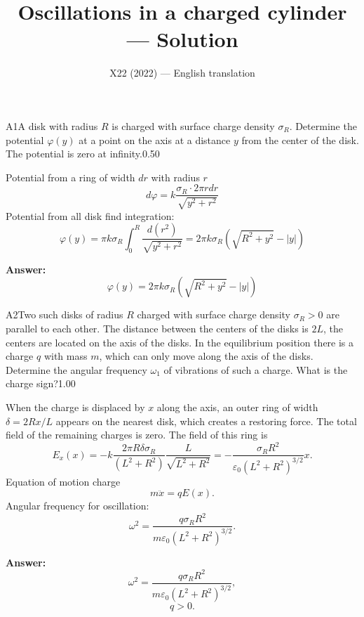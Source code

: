 \documentclass[11pt,a4paper]{article}
\title{\textbf{Oscillations in a charged cylinder --- Solution}}
\author{\normalsize X22 (2022) — English translation}
\date{}
\begin{document}
\maketitle\vspace{-0.5em}
\begin{solcard}{A1}{A disk with radius $R$ is charged with surface charge density $\sigma_R$. Determine the potential $\varphi(y)$ at a point on the axis at a distance $y$ from the center of the disk. The potential is zero at infinity.}{0.50}

Potential from a ring of width $dr$ with radius $r$ $$d \varphi = k \frac{\sigma_R \cdot 2 \pi r dr}{\sqrt{y^2 + r^2} }$$ Potential from all disk find integration: $$\varphi(y)= \pi k \sigma_R \int^R_0 \frac{d(r^2)}{\sqrt{y^2 + r^2} } =2\pi k \sigma_R \left( \sqrt{R^2+y^2}- |y| \right)$$

\par\smallskip\noindent\textbf{Answer:} $$\varphi(y)=2\pi k \sigma_R \left( \sqrt{R^2+y^2}- |y| \right)$$
\end{solcard}

\begin{solcard}{A2}{Two such disks of radius $R$ charged with surface charge density $\sigma_R>0$ are parallel to each other. The distance between the centers of the disks is $2L$, the centers are located on the axis of the disks. In the equilibrium position there is a charge $q$ with mass $m$, which can only move along the axis of the disks. Determine the angular frequency $\omega_1$ of vibrations of such a charge. What is the charge sign?}{1.00}

When the charge is displaced by $x$ along the axis, an outer ring of width $\delta = 2 Rx/L$ appears on the nearest disk, which creates a restoring force. The total field of the remaining charges is zero. The field of this ring is $$E_x(x) = - k \frac{2\pi R \delta \sigma_R}{(L^2+R^2)} \frac{L}{\sqrt{L^2+R^2}}=-\frac{\sigma_R R^2}{\varepsilon_0 (L^2+R^2)^{3/2}}x.$$ Equation of motion charge $$m\ddot{x}=qE(x).$$ Angular frequency for oscillation: $$\omega^2=\frac{q\sigma_R R^2}{m \varepsilon_0  (L^2+R^2)^{3/2}}.$$

\par\smallskip\noindent\textbf{Answer:} $$\omega^2=\frac{q\sigma_R R^2}{m \varepsilon_0  (L^2+R^2)^{3/2}},$$ $$q>0.$$
\end{solcard}
\end{document}
